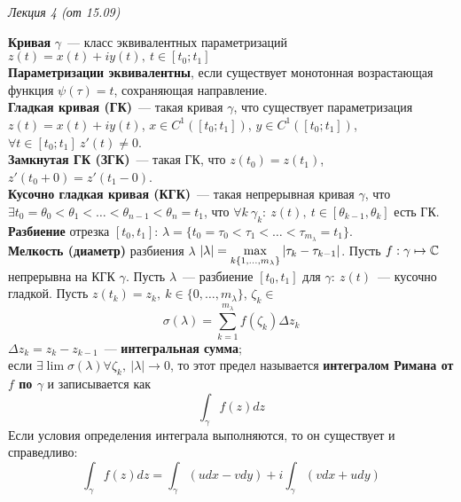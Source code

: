 \begin{flushright}
    \textit{Лекция 4 (от 15.09)}
\end{flushright}

\textbf{Кривая} $\gamma$~--- класс эквивалентных параметризаций $z(t) = x(t) +
iy(t), \ t \in \left[ t_0; t_1 \right]$
\\
\textbf{Параметризации эквивалентны}, если существует монотонная возрастающая
функция $\psi(\tau) = t$, сохраняющая направление.
\\
\textbf{Гладкая кривая (ГК)}~--- такая кривая $\gamma$, что существует параметризация
$z(t) = x(t) + iy(t)$, $x \in C^1 \left( \left[ t_0; t_1 \right] \right)$, $y
\in C^1 \left( \left[ t_0; t_1 \right] \right)$, $\forall t \in \left[ t_0; t_1
\right] \ z'(t) \neq 0$.
\\
\textbf{Замкнутая ГК (ЗГК)}~--- такая ГК, что $z(t_0) = z(t_1)$, $z'(t_0+0) =
z'(t_1-0)$.
\\
\textbf{Кусочно гладкая кривая (КГК)}~--- такая непрерывная кривая $\gamma$, что
$\exists t_0 = \theta_0 < \theta_1 < \dots < \theta_{n-1} < \theta_n = t_1$, что
$\forall k \ \gamma_k: \ z(t), \ t \in [\theta_{k-1}, \theta_k]$ есть ГК.
\\
\textbf{Разбиение} отрезка $\left[ t_0, t_1 \right]$: $\lambda = \{t_0 = \tau_0
< \tau_1 < \dots < \tau_{m_\lambda} = t_1\}$.
\\
\textbf{Мелкость (диаметр)} разбиения $\lambda$ $\left| \lambda \right| = \displaystyle
\max_{k \{1, \dots, m_\lambda\}}\left| \tau_k - \tau_{k-1} \right|$.
\Def Пусть $f: \gamma \mapsto \mathbb{C}$ непрерывна на КГК $\gamma$. Пусть
$\lambda$~--- разбиение $\left[ t_0, t_1 \right]$ для $\gamma: \ z(t)$~---
кусочно гладкой. Пусть $z(t_k) = z_k, \ k \in \{0, \dots, m_\lambda\}$, $\zeta_k
\in$
\[\sigma(\lambda) = \sum_{k = 1}^{m_{\lambda}} f(\zeta_k) \Delta z_k\]
$\Delta z_k = z_k - z_{k-1}$~--- \textbf{интегральная сумма};
\\
если $\exists \lim
\sigma(\lambda) \forall \zeta_k, \ \left| \lambda \right| \to 0$, то этот предел
называется \textbf{интегралом Римана от $f$ по $\gamma$} и записывается как
\begin{equation} \label{(6.1)}
  \int_{\gamma}f(z) dz
\end{equation}
\theorem
Если условия определения интеграла выполняются, то он существует и справедливо:
\begin{equation} \label{(6.2)}
    \int_{\gamma}f(z)dz = \int_{\gamma}\left( u dx - v dy \right) + i \int_\gamma \left( v dx + u dy \right)
    \end{equation}
